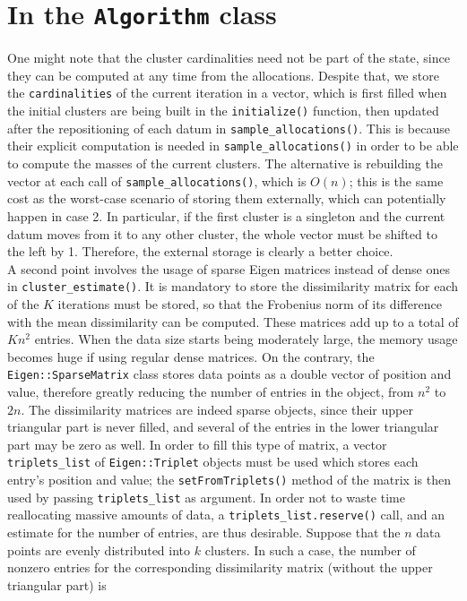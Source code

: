 \section{In the \texttt{Algorithm} class}
One might note that the cluster cardinalities need not be part of the state, since they can be computed at any time from the allocations.
Despite that, we store the \verb|cardinalities| of the current iteration in a vector, which is first filled when the initial clusters are being built in the \verb|initialize()| function, then updated after the repositioning of each datum in \verb|sample_allocations()|.
This is because their explicit computation is needed in \verb|sample_allocations()| in order to be able to compute the masses of the current clusters.
The alternative is rebuilding the vector at each call of \verb|sample_allocations()|, which is $O(n)$; this is the same cost as the worst-case scenario of storing them externally, which can potentially happen in case 2.
In particular, if the first cluster is a singleton and the current datum moves from it to any other cluster, the whole vector must be shifted to the left by 1.
Therefore, the external storage is clearly a better choice. \\
A second point involves the usage of sparse Eigen matrices instead of dense ones in \verb|cluster_estimate()|.
It is mandatory to store the dissimilarity matrix for each of the $K$ iterations must be stored, so that the Frobenius norm of its difference with the mean dissimilarity can be computed.
These matrices add up to a total of $K n^2$ entries.
When the data size starts being moderately large, the memory usage becomes huge if using regular dense matrices.
On the contrary, the \verb|Eigen::SparseMatrix| class stores data points as a double vector of position and value, therefore greatly reducing the number of entries in the object, from $n^2$ to $2n$.
The dissimilarity matrices are indeed sparse objects, since their upper triangular part is never filled, and several of the entries in the lower triangular part may be zero as well.
In order to fill this type of matrix, a vector \verb|triplets_list| of \verb|Eigen::Triplet| objects must be used which stores each entry's position and value; the \verb|setFromTriplets()| method of the matrix is then used by passing \verb|triplets_list| as argument.
In order not to waste time reallocating massive amounts of data, a \verb|triplets_list.reserve()| call, and an estimate for the number of entries, are thus desirable.
Suppose that the $n$ data points are evenly distributed into $k$ clusters.
In such a case, the number of nonzero entries for the corresponding dissimilarity matrix (without the upper triangular part) is
